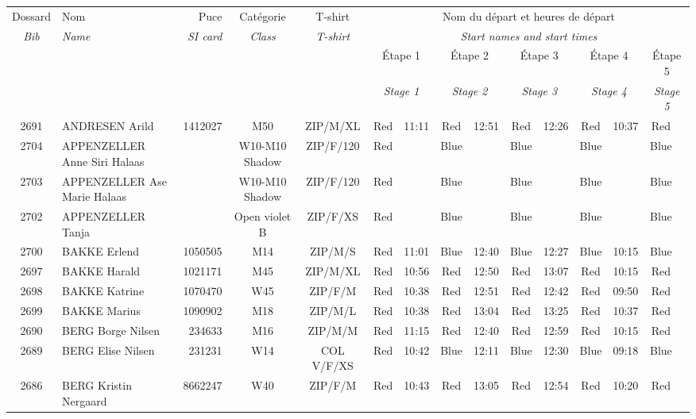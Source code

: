 \documentclass{report}
\begin{document}
  \begin{longtable}{|c|l|r|c|c|*{5}{cc|}}
    Dossard & Nom  & Puce    & Catégorie & T-shirt & \multicolumn{10}{c|}{Nom du départ et heures de départ} \\
    \itshape Bib     & \itshape Name & \itshape SI card & \itshape Class  & \itshape  T-shirt  & \multicolumn{10}{c|}{\itshape Start names and start times} \\
    \hline
    & & & & & \multicolumn{2}{c|}{Étape 1} & \multicolumn{2}{c|}{Étape 2} & \multicolumn{2}{c|}{Étape 3} & \multicolumn{2}{c|}{Étape 4} & \multicolumn{2}{c|}{Étape 5} \\
    & & & & & \multicolumn{2}{c|}{\itshape Stage 1} & \multicolumn{2}{c|}{\itshape Stage 2} & \multicolumn{2}{c|}{\itshape Stage 3} & \multicolumn{2}{c|}{\itshape Stage 4} & \multicolumn{2}{c|}{\itshape Stage 5} \\
    \hline
    2691 & ANDRESEN Arild & 1412027 & M50 & ZIP/M/XL & Red & 11:11 & Red & 12:51 & Red & 12:26 & Red & 10:37 & Red &  \\
    2704 & APPENZELLER Anne Siri Halaas &  & W10-M10 Shadow & ZIP/F/120 & Red &   & Blue &   & Blue &   & Blue &   & Blue &  \\
    2703 & APPENZELLER Ase Marie Halaas &  & W10-M10 Shadow & ZIP/F/120 & Red &   & Blue &   & Blue &   & Blue &   & Blue &  \\
    2702 & APPENZELLER Tanja &  & Open violet B & ZIP/F/XS & Red &   & Blue &   & Blue &   & Blue &   & Blue &  \\
    2700 & BAKKE Erlend & 1050505 & M14 & ZIP/M/S & Red & 11:01 & Blue & 12:40 & Blue & 12:27 & Blue & 10:15 & Blue &  \\
    2697 & BAKKE Harald & 1021171 & M45 & ZIP/M/XL & Red & 10:56 & Red & 12:50 & Red & 13:07 & Red & 10:15 & Red &  \\
    2698 & BAKKE Katrine & 1070470 & W45 & ZIP/F/M & Red & 10:38 & Red & 12:51 & Red & 12:42 & Red & 09:50 & Red &  \\
    2699 & BAKKE Marius & 1090902 & M18 & ZIP/M/L & Red & 10:38 & Red & 13:04 & Red & 13:25 & Red & 10:37 & Red &  \\
    2690 & BERG Borge Nilsen & 234633 & M16 & ZIP/M/M & Red & 11:15 & Red & 12:40 & Red & 12:59 & Red & 10:15 & Red &  \\
    2689 & BERG Elise Nilsen & 231231 & W14 & COL V/F/XS & Red & 10:42 & Blue & 12:11 & Blue & 12:30 & Blue & 09:18 & Blue &  \\
    2686 & BERG Kristin Nergaard & 8662247 & W40 & ZIP/F/M & Red & 10:43 & Red & 13:05 & Red & 12:54 & Red & 10:20 & Red &  \\

\end{longtable}
\end{document}

